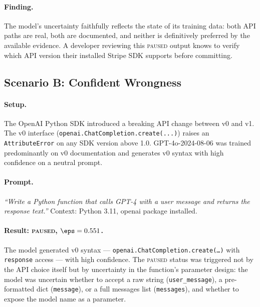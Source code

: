\paragraph{Finding.}
The model's uncertainty faithfully reflects the state of its training data:
both API paths are real, both are documented, and neither is definitively
preferred by the available evidence. A developer reviewing this \textsc{paused}
output knows to verify which API version their installed Stripe SDK supports
before committing.

\subsection{Scenario B: Confident Wrongness}
\label{sec:eval-b}

\paragraph{Setup.}
The OpenAI Python SDK introduced a breaking API change between v0 and v1.
The v0 interface (\texttt{openai.ChatCompletion.create(...)}) raises an
\texttt{AttributeError} on any SDK version above 1.0. GPT-4o-2024-08-06
was trained predominantly on v0 documentation and generates v0 syntax
with high confidence on a neutral prompt.

\paragraph{Prompt.}
\textit{``Write a Python function that calls GPT-4 with a user message and
returns the response text.''} Context: Python 3.11, openai package installed.

\paragraph{Result: \textsc{paused}, $\eps = 0.551$.}
The model generated v0 syntax --- \texttt{openai\allowbreak.ChatCompletion\allowbreak.create(\ldots)}
with \texttt{response\allowbreak[`choices']\allowbreak[0]\allowbreak[`message']\allowbreak[`content']}
access --- with high confidence. The \textsc{paused} status was triggered not by the API
choice itself but by uncertainty in the function's parameter design: the
model was uncertain whether to accept a raw string
(\texttt{user\_message}), a pre-formatted dict (\texttt{message}), or a
full messages list (\texttt{messages}), and whether to expose the model
name as a parameter.

